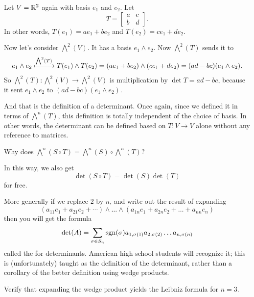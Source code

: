 \begin{example}
	Let $V = \mathbb R^2$ again with basis $e_1$ and $e_2$.
	Let
	\[ T = \begin{bmatrix}
			a & c \\ b & d
		\end{bmatrix}.
	\]
	In other words, $T(e_1) = ae_1 + be_2$
	and $T(e_2) = ce_1 + de_2$.

	Now let's consider $\bigwedge^2(V)$.
	It has a basis $e_1 \wedge e_2$.
	Now $\bigwedge^2(T)$ sends it to
	\[ e_1 \wedge e_2 \xmapsto{\bigwedge^2(T)}
		T(e_1) \wedge T(e_2) =
		(ae_1 + be_2) \wedge (ce_1 + de_2)
		= (ad-bc)(e_1 \wedge e_2).
	\]
	So $\bigwedge^2(T) \colon \bigwedge^2(V) \to \bigwedge^2(V)$
	is multiplication by $\det T = ad-bc$,
	because it sent $e_1 \wedge e_2$ to
	$(ad-bc)(e_1 \wedge e_2)$.
\end{example}
And that is the definition of a determinant.
Once again, since we defined it in terms of $\bigwedge^n(T)$,
this definition is totally independent of the choice of basis.
In other words, the determinant can be defined based on $T \colon V \to V$ alone
without any reference to matrices.

\begin{ques}
	Why does $\bigwedge^n(S \circ T) = \bigwedge^n(S) \circ \bigwedge^n(T)$?
\end{ques}
In this way, we also get \[ \det(S \circ T) = \det(S) \det(T) \] for free.

More generally if we replace $2$ by $n$,
and write out the result of expanding
\[ \left( a_{11}e_1 + a_{21}e_2 + \cdots \right) \wedge \dots \wedge
	\left( a_{1n}e_1 + a_{2n}e_2 + \dots + a_{nn} e_n \right) \]
then you will get the formula
\[ \det(A) = \sum_{\sigma \in S_n} \operatorname{sgn}(\sigma)
	a_{1, \sigma(1)} a_{2, \sigma(2)} \dots a_{n, \sigma(n)} \]
called the  for determinants.
American high school students will recognize it;
this is (unfortunately) taught as the definition of the determinant,
rather than a corollary of the better definition using wedge products.

\begin{exercise}
	Verify that expanding the wedge product
	yields the Leibniz formula for $n=3$.
\end{exercise}

